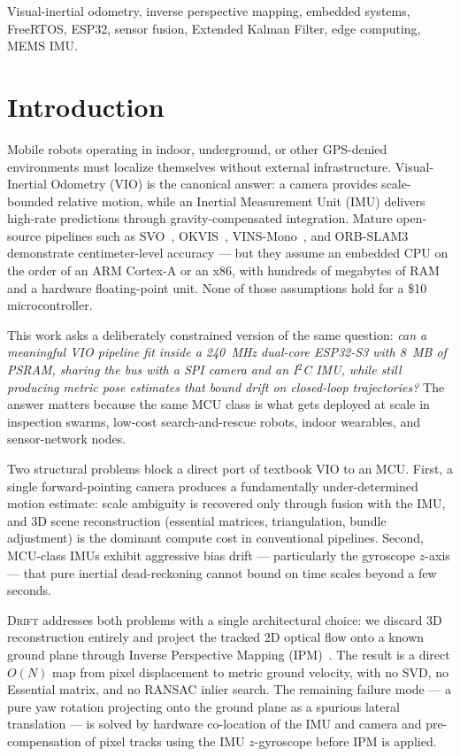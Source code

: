 \documentclass[conference]{IEEEtran}
\begin{document}
\begin{IEEEkeywords}
Visual-inertial odometry, inverse perspective mapping, embedded
systems, FreeRTOS, ESP32, sensor fusion, Extended Kalman Filter,
edge computing, MEMS IMU.
\end{IEEEkeywords}

\section{Introduction}
\label{sec:intro}

Mobile robots operating in indoor, underground, or other GPS-denied
environments must localize themselves without external infrastructure.
Visual-Inertial Odometry (VIO) is the canonical answer: a camera
provides scale-bounded relative motion, while an Inertial Measurement
Unit (IMU) delivers high-rate predictions through gravity-compensated
integration.  Mature open-source pipelines such as
SVO~\cite{forster2014svo}, OKVIS~\cite{leutenegger2015okvis},
VINS-Mono~\cite{qin2018vinsmono}, and ORB-SLAM3~\cite{campos2021orbslam3}
demonstrate centimeter-level accuracy --- but they assume an embedded
CPU on the order of an ARM Cortex-A or an x86, with hundreds of
megabytes of RAM and a hardware floating-point unit. None of those
assumptions hold for a \$10 microcontroller.

This work asks a deliberately constrained version of the same
question: \emph{can a meaningful VIO pipeline fit inside a 240~MHz
dual-core ESP32-S3 with 8~MB of PSRAM, sharing the bus with a SPI
camera and an I${}^2$C IMU, while still producing metric pose
estimates that bound drift on closed-loop trajectories?}  The
answer matters because the same MCU class is what gets deployed at
scale in inspection swarms, low-cost search-and-rescue robots,
indoor wearables, and sensor-network nodes.

Two structural problems block a direct port of textbook VIO to an
MCU.  First, a single forward-pointing camera produces a fundamentally
under-determined motion estimate: scale ambiguity is recovered only
through fusion with the IMU, and 3D scene reconstruction (essential
matrices, triangulation, bundle adjustment) is the dominant compute
cost in conventional pipelines.  Second, MCU-class IMUs exhibit
aggressive bias drift --- particularly the gyroscope $z$-axis ---
that pure inertial dead-reckoning cannot bound on time scales beyond
a few seconds.

\textsc{Drift} addresses both problems with a single architectural
choice: we discard 3D reconstruction entirely and project the tracked
2D optical flow onto a known ground plane through Inverse Perspective
Mapping (IPM)~\cite{mallot1991ipm,bertozzi1998gold}.  The result is a
direct $O(N)$ map from pixel displacement to metric ground velocity,
with no SVD, no Essential matrix, and no RANSAC inlier search.  The
remaining failure mode --- a pure yaw rotation projecting onto the
ground plane as a spurious lateral translation --- is solved by
hardware co-location of the IMU and camera and pre-compensation of
pixel tracks using the IMU $z$-gyroscope before IPM is applied.
\end{document}
